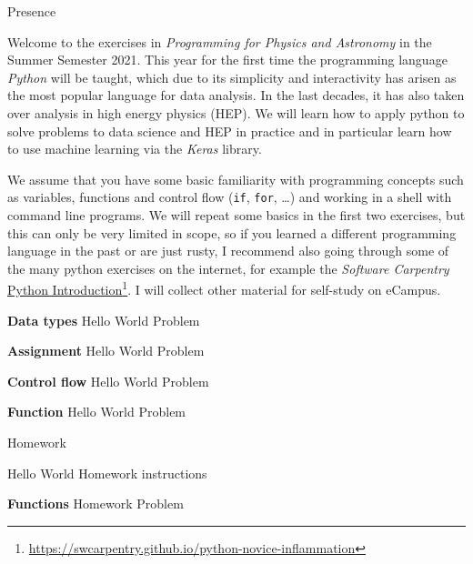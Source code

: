 \documentclass[english,ngerman]{article}
\begin{document}


\begin{exam}[Presence]{Presence}
  \begin{instructions}[Introduction]

    Welcome to the exercises in \emph{Programming for Physics and Astronomy} in
    the Summer Semester 2021. This year for the first time the programming
    language \emph{Python} will be taught, which due to its simplicity and
    interactivity has arisen as the most popular language for data analysis. In
    the last decades, it has also taken over analysis in high energy physics (HEP). We
    will learn how to apply python to solve problems to data science and HEP in
    practice and in particular learn how to use machine learning via the
    \emph{Keras} library.

    We assume that you have some basic familiarity with programming concepts
    such as variables, functions and control flow (\lstinline{if},
    \lstinline{for}, \ldots) and working in a shell with command line programs.
    We will repeat some basics in the first two exercises, but this can only be
    very limited in scope, so if you learned a different programming language in
    the past or are just rusty, I recommend also going through some of the many
    python exercises on the internet, for example the \emph{Software Carpentry}
    \href{https://swcarpentry.github.io/python-novice-inflammation}{Python Introduction}\footnote{%
      \url{https://swcarpentry.github.io/python-novice-inflammation}}.
    I will collect other material for self-study on eCampus.

  \end{instructions}
  \begin{problem}\textbf{Data types}
    Hello World Problem
  \end{problem}
  \begin{problem}\textbf{Assignment}
    Hello World Problem
  \end{problem}
  \begin{problem}\textbf{Control flow}
    Hello World Problem
  \end{problem}
  \begin{problem}\textbf{Function}
    Hello World Problem
  \end{problem}
\end{exam}

\newpage
\begin{exam}[Homework]{Homework}
  \begin{instructions}
    Hello World Homework instructions
  \end{instructions}

  \begin{problem}[3]{\textbf{Functions}}
    Homework Problem
  \end{problem}
\end{exam}
\end{document}
